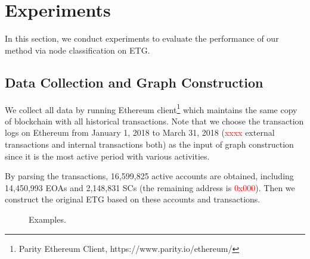
\section{Experiments}
In this section, we conduct experiments to evaluate the performance of our method via node classification on ETG.

\subsection{Data Collection and Graph Construction}
We collect all data by running Ethereum client\footnote{Parity Ethereum Client, https://www.parity.io/ethereum/} which maintains the same copy of blockchain with all historical transactions. Note that we choose the transaction logs on Ethereum from January 1, 2018 to March 31, 2018 (\textcolor{red}{xxxx} external transactions and internal transactions both) as the input of graph construction since it is the most active period with various activities.

By parsing the transactions, 16,599,825 active accounts are obtained, including 14,450,993 EOAs and 2,148,831 SCs (the remaining address is \textcolor{red}{0x000}). Then we construct the original ETG based on these accounts and transactions.

\begin{figure}[htbp]
	\centering
	\caption{Examples.}
\end{figure}

